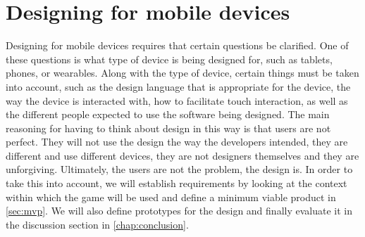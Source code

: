 \section{Designing for mobile devices}\label{sec:design-intro}
Designing for mobile devices requires that certain questions be clarified.
One of these questions is what type of device is being designed for, such as tablets, phones, or wearables.
Along with the type of device, certain things must be taken into account, such as the design language that is appropriate for the device, the way the device is interacted with,  how to facilitate touch interaction, as well as the different people expected to use the software being designed.
The main reasoning for having to think about design in this way is that users are not perfect.
They will not use the design the way the developers intended, they are different and use different devices, they are not designers themselves and they are unforgiving.
Ultimately, the users are not the problem, the design is.
In order to take this into account, we will establish requirements by looking at the context within which the game will be used and define a minimum viable product in \autoref{sec:mvp}.
We will also define prototypes for the design and finally evaluate it in the discussion section in \autoref{chap:conclusion}.
